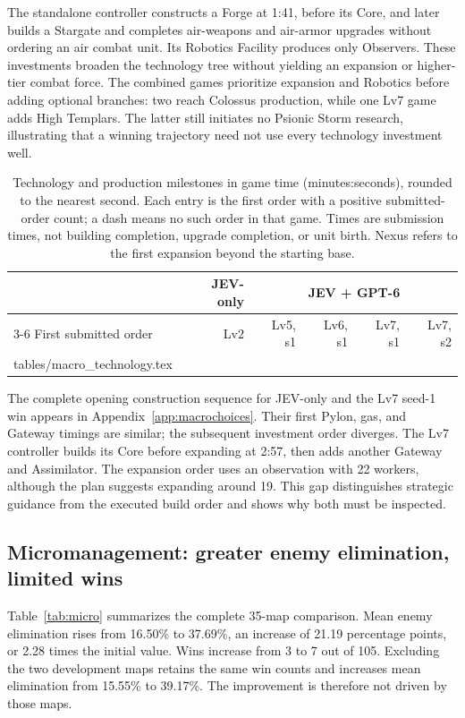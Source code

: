 \documentclass{article}
\makeatletter
\newcommand{\tablerows}[1]{\@@input #1 }
\newcommand{\captionbelowtable}{\normalsize\setlength{\abovecaptionskip}{7pt}\setlength{\belowcaptionskip}{0pt}}
\makeatother
\begin{document}
The standalone controller constructs a Forge at 1:41, before its Core, and later builds a Stargate and completes air-weapons and air-armor upgrades without ordering an air combat unit. Its Robotics Facility produces only Observers. These investments broaden the technology tree without yielding an expansion or higher-tier combat force. The combined games prioritize expansion and Robotics before adding optional branches: two reach Colossus production, while one Lv7 game adds High Templars. The latter still initiates no Psionic Storm research, illustrating that a winning trajectory need not use every technology investment well.

\begin{table}[t]
\centering\small
\setlength{\tabcolsep}{5pt}
\begin{tabular}{lrrrrr}
\toprule
& JEV-only & \multicolumn{4}{c}{JEV + GPT-6} \\
\cmidrule(lr){3-6}
First submitted order & Lv2 & Lv5, s1 & Lv6, s1 & Lv7, s1 & Lv7, s2 \\
\midrule
\tablerows{tables/macro_technology.tex}
\bottomrule
\end{tabular}
\captionbelowtable
\caption{Technology and production milestones in game time (minutes:seconds), rounded to the nearest second. Each entry is the first order with a positive submitted-order count; a dash means no such order in that game. Times are submission times, not building completion, upgrade completion, or unit birth. Nexus refers to the first expansion beyond the starting base.}
\label{tab:technology}
\end{table}

The complete opening construction sequence for JEV-only and the Lv7 seed-1 win appears in Appendix~\ref{app:macrochoices}. Their first Pylon, gas, and Gateway timings are similar; the subsequent investment order diverges. The Lv7 controller builds its Core before expanding at 2:57, then adds another Gateway and Assimilator. The expansion order uses an observation with 22 workers, although the plan suggests expanding around 19. This gap distinguishes strategic guidance from the executed build order and shows why both must be inspected.

\subsection{Micromanagement: greater enemy elimination, limited wins}

Table~\ref{tab:micro} summarizes the complete 35-map comparison. Mean enemy elimination rises from 16.50\% to 37.69\%, an increase of 21.19 percentage points, or 2.28 times the initial value. Wins increase from 3 to 7 out of 105. Excluding the two development maps retains the same win counts and increases mean elimination from 15.55\% to 39.17\%. The improvement is therefore not driven by those maps.
\end{document}
